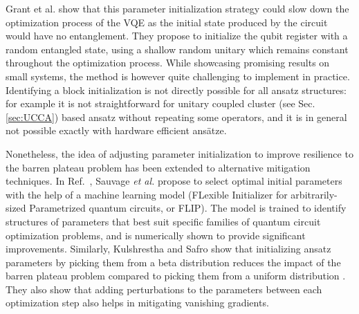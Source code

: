 Grant et al. \cite{Grant2019} show that this parameter initialization strategy could slow down the optimization process of the VQE as the initial state produced by the circuit would have no entanglement. They propose to initialize the qubit register with a random entangled state, using a shallow random unitary which remains constant throughout the optimization process. While showcasing promising results on small systems, the method is however quite challenging to implement in practice. Identifying a block initialization is not directly possible for all ansatz structures: for example it is not straightforward for unitary coupled cluster (see Sec. \ref{sec:UCCA}) based ansatz without repeating some operators, and it is in general not possible exactly with hardware efficient ans{\"{a}}tze. 

Nonetheless, the idea of adjusting parameter initialization to improve resilience to the barren plateau problem has been extended to alternative mitigation techniques. In Ref.~\cite{Sauvage2021}, Sauvage \textit{et al.} propose to select optimal initial parameters with the help of a machine learning model (FLexible Initializer for arbitrarily-sized Parametrized quantum circuits, or FLIP). The model is trained to identify structures of parameters that best suit specific families of quantum circuit optimization problems, and is numerically shown to provide significant improvements. Similarly, Kulshrestha and Safro show that initializing ansatz parameters by picking them from a beta distribution reduces the impact of the barren plateau problem compared to picking them from a uniform distribution \cite{Kulshrestha2022}. They also show that adding perturbations to the parameters between each optimization step also helps in mitigating vanishing gradients.

